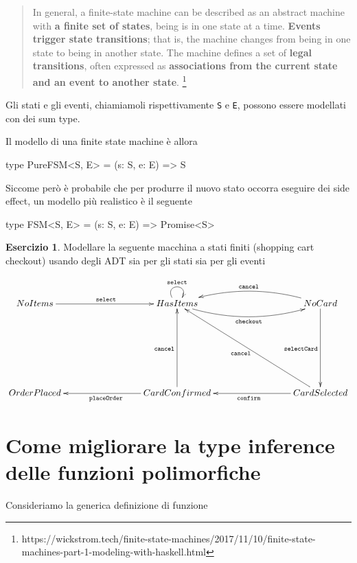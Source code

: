 \documentclass[12pt]{article}
\theoremstyle{definition}
\newtheorem{exercise}{Esercizio}[subsection]
\newenvironment{code}
  {\vspace{0.5cm} \VerbatimEnvironment\begin{typescriptcode}}
  {\end{typescriptcode} \vspace{0.2cm}}
\begin{document}
\begin{quote}
In general, a finite-state machine can be described as an abstract machine with \textbf{a finite set of states},
being is in one state at a time. \textbf{Events trigger state transitions}; that is, the machine changes from being in one
state to being in another state. The machine defines a set of \textbf{legal transitions}, often expressed as \textbf{associations
from the current state and an event to another state}.
\footnote{https://wickstrom.tech/finite-state-machines/2017/11/10/finite-state-machines-part-1-modeling-with-haskell.html}
\end{quote}

Gli stati e gli eventi, chiamiamoli rispettivamente \texttt{S} e \texttt{E}, possono essere modellati con dei sum type.

Il modello di una finite state machine è allora

\begin{code}
type PureFSM<S, E> = (s: S, e: E) => S
\end{code}

Siccome però è probabile che per produrre il nuovo stato occorra eseguire dei side effect, un modello più realistico è il seguente

\begin{code}
type FSM<S, E> = (s: S, e: E) => Promise<S>
\end{code}

\begin{exercise}
Modellare la seguente macchina a stati finiti (shopping cart checkout) usando degli ADT sia per gli stati sia per gli eventi

\[
\xymatrixrowsep{3cm}
\xymatrixcolsep{3cm}
\xymatrix{
  NoItems \ar[r]^{\texttt{select}} & HasItems \ar@(ul,ur)^{\texttt{select}} \ar@/_0.5cm/[r]_{\texttt{checkout}} & NoCard \ar[d]_{\texttt{selectCard}} \ar@/_0.5cm/[l]_{\texttt{cancel}} \\
  OrderPlaced & CardConfirmed \ar[u]^{\texttt{cancel}} \ar[l]^{\texttt{placeOrder}} & CardSelected \ar[ul]^{\texttt{cancel}} \ar[l]^{\texttt{confirm}} \\
}
\]
\end{exercise}

\newpage
\section{Come migliorare la type inference delle funzioni polimorfiche}

Consideriamo la generica definizione di funzione
\end{document}
